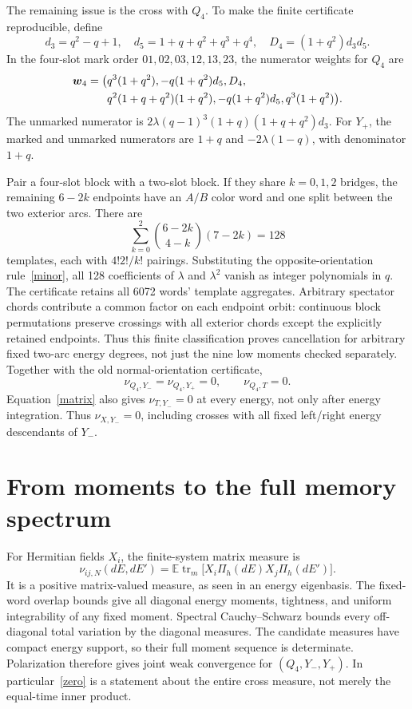 \documentclass[11pt,a4paper]{article}
\newcommand{\EE}{\mathbb E}
\newcommand{\tr}{\operatorname{tr}}
\begin{document}
The remaining issue is the cross with $Q_4$. To make the finite
certificate reproducible, define
\begin{equation}
 d_3=q^2-q+1,\quad d_5=1+q+q^2+q^3+q^4,\quad D_4=(1+q^2)d_3d_5.
\end{equation}
In the four-slot mark order $01,02,03,12,13,23$, the numerator
weights for $Q_4$ are
\begin{align}
 \boldsymbol w_4=\big(&q^3(1+q^2),-q(1+q^2)d_5,D_4,\notag\\
 &q^2(1+q+q^2)(1+q^2),-q(1+q^2)d_5,q^3(1+q^2)\big).
\end{align}
The unmarked numerator is
$2\lambda(q-1)^3(1+q)(1+q+q^2)d_3$.
For $Y_+$, the marked and unmarked numerators are
$1+q$ and $-2\lambda(1-q)$, with denominator $1+q$.

Pair a four-slot block with a two-slot block. If they share
$k=0,1,2$ bridges, the remaining $6-2k$ endpoints have an $A/B$
color word and one split between the two exterior arcs. There are
\begin{equation}
 \sum_{k=0}^2\binom{6-2k}{4-k}(7-2k)=128
\end{equation}
templates, each with $4!2!/k!$ pairings. Substituting the
opposite-orientation rule~\eqref{minor}, all 128 coefficients of
$\lambda$ and $\lambda^2$ vanish as integer polynomials in $q$.
The certificate retains all 6072 words' template aggregates.
Arbitrary spectator chords contribute a common factor on each
endpoint orbit: continuous block permutations preserve crossings
with all exterior chords except the explicitly retained endpoints.
Thus this finite classification proves cancellation for arbitrary
fixed two-arc energy degrees, not just the nine low moments checked
separately. Together with the old normal-orientation certificate,
\begin{equation}
 \nu_{Q_4,Y_-}=\nu_{Q_4,Y_+}=0,\qquad \nu_{Q_4,T}=0. \label{zero}
\end{equation}
Equation~\eqref{matrix} also gives $\nu_{T,Y_-}=0$ at every energy,
not only after energy integration. Thus $\nu_{X,Y_-}=0$, including
crosses with all fixed left/right energy descendants of $Y_-$.

\newpage
\section{From moments to the full memory spectrum}
For Hermitian fields $X_i$, the finite-system matrix measure is
\begin{equation}
 \nu_{ij,N}(dE,dE')=
 \EE\tr_m\big[X_i\Pi_h(dE)X_j\Pi_h(dE')\big].
\end{equation}
It is a positive matrix-valued measure, as seen in an energy
eigenbasis. The fixed-word overlap bounds give all diagonal energy
moments, tightness, and uniform integrability of any fixed moment.
Spectral Cauchy--Schwarz bounds every off-diagonal total variation
by the diagonal measures. The candidate measures have compact
energy support, so their full moment sequence is determinate.
Polarization therefore gives joint weak convergence for
$(Q_4,Y_-,Y_+)$. In particular~\eqref{zero} is a statement about
the entire cross measure, not merely the equal-time inner product.
\end{document}
